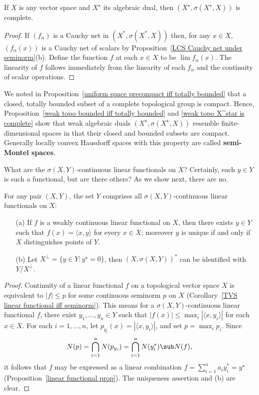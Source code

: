 \begin{proposition}\label{weak topo X^star is complete}
If $X$ is any vector space and $X^{\star}$ its algebraic dual, then $(X^{\star},\sigma(X^{\star},X))$ is complete.
\end{proposition}
\begin{proof}
If $(f_\alpha)$ is a Cauchy net in $(X^*,\sigma(X^*,X))$ then, for any $x\in X$, $(f_\alpha(x))$ is a Cauchy net of scalars by Proposition~\ref{LCS Cauchy net under seminorm}(b). Define the function $f$ at each $x\in X$ to be $\lim f_\alpha(x)$. The linearity of $f$ follows immediately from the linearity of each $f_\alpha$ and the continuity of scalar operations.
\end{proof}
We noted in Proposition~\ref{uniform space precompact iff totally bounded} that a closed, totally bounded subset of a complete topological group is compact. Hence, Proposition~\ref{weak topo bounded iff totally bounded} and \ref{weak topo X^star is complete} show that weak algebraic duals $(X^{\star},\sigma(X^{\star},X))$ resemble finite-dimensional spaces in that their closed and bounded subsets are compact. Generally locally convex Hausdorff spaces with this property are called \textbf{semi-Montel spaces}.\par
What are the $\sigma(X,Y)$-continuous linear functionals on $X$? Certainly, each $y\in Y$ is such a functional, but are there others? As we show next, there are no.
\begin{theorem}\label{weak representation theorem}
For any pair $(X,Y)$, the set $Y$ comprises all $\sigma(X,Y)$-continuous linear functionals on $X$:
\begin{itemize}
\item[(a)] If $f$ is a weakly continuous linear functional on $X$, then there exists $y\in Y$ such that $f(x)=\langle x,y\rangle$ for every $x\in X$; moreover $y$ is unique if and only if $X$ distinguishes points of $Y$.
\item[(b)] Let $X^\bot=\{y\in Y:y^{\star}=0\}$, then $(X,\sigma(X,Y))^*$ can be identified with $Y/X^\bot$.
\end{itemize}
\end{theorem}
\begin{proof}
Continuity of a linear functional $f$ on a topological vector space $X$ is equivalent to $|f|\leq p$ for some continuous seminorm $p$ on $X$ (Corollary~\ref{TVS linear functional iff seminorm}). This means for a $\sigma(X,Y)$-continuous linear functional $f$, there exist $y_1,\dots,y_n\in Y$ such that $|f(x)|\leq\max_i|\langle x,y_i\rangle|$ for each $x\in X$. For each $i=1,\dots,n$, let $p_{y_i}(x)=|\langle x,y_i\rangle|$, and set $p=\max_ip_i$. Since
\[N(p)=\bigcap_{i=1}^{n}N(p_{y_i})=\bigcap_{i=1}^{n}N(y_i^*)\sub N(f),\]
it follows that $f$ may be expressed as a linear combination $f=\sum_{i=1}^{n}a_iy_i^*=y^{\star}$ (Proposition~\ref{linear functional prop}). The uniqueness assertion and (b) are clear.
\end{proof}

